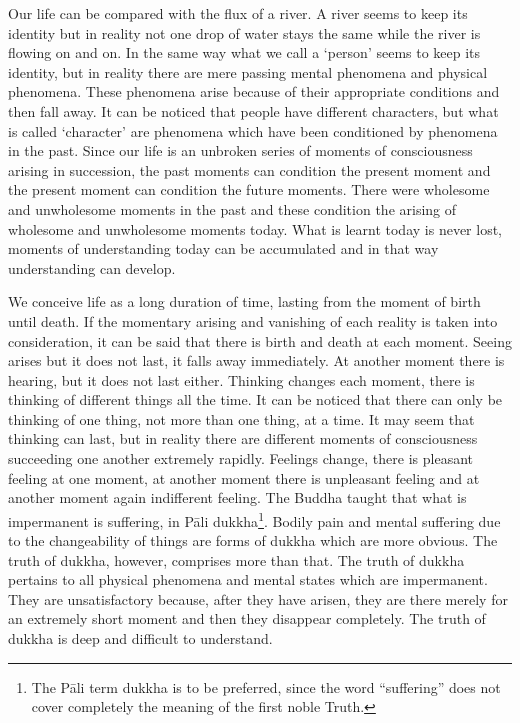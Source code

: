 \documentclass{book}
\begin{document}
Our life can be compared with the flux of a river. A river seems to keep
its identity but in reality not one drop of water stays the same while
the river is flowing on and on. In the same way what we call a `person'
seems to keep its identity, but in reality there are mere passing mental
phenomena and physical phenomena. These phenomena arise because of their
appropriate conditions and then fall away. It can be noticed that people
have different charac­ters, but what is called `character' are
phenomena which have been conditioned by phenomena in the past. Since
our life is an unbroken series of moments of conscious­ness arising in
succession, the past moments can condition the present moment and the
present moment can condition the future moments. There were wholesome
and unwholesome moments in the past and these condi­tion the arising of
wholesome and unwhole­some moments today. What is learnt today is never
lost, moments of understanding today can be accumulated and in that way
understanding can develop.

We conceive life as a long duration of time, lasting from the moment of
birth until death. If the momentary arising and vanishing of each
reality is taken into consideration, it can be said that there is birth
and death at each moment. Seeing arises but it does not last, it falls
away imme­diately. At another moment there is hearing, but it does not
last either. Thinking changes each moment, there is thinking of
different things all the time. It can be noticed that there can only be
thinking of one thing, not more than one thing, at a time. It may seem
that thinking can last, but in reality there are different moments of
con­sciousness succeeding one another extremely rapidly. Feelings
change, there is pleasant feeling at one moment, at another moment there
is unpleasant feeling and at another moment again indifferent feeling.
The Buddha taught that what is impermanent is suffering, in Pāli
dukkha\footnote{The Pāli term dukkha is to be preferred, since the word
  ``suffering'' does not cover completely the meaning of the first noble
  Truth.}. Bodily pain and mental suffering due to the changeability of
things are forms of dukkha which are more obvious. The truth of dukkha,
however, comprises more than that. The truth of dukkha pertains to all
physical phenomena and mental states which are imper­manent. They are
unsatisfactory because, after they have arisen, they are there merely
for an extremely short moment and then they disappear completely. The
truth of dukkha is deep and difficult to understand.
\end{document}
